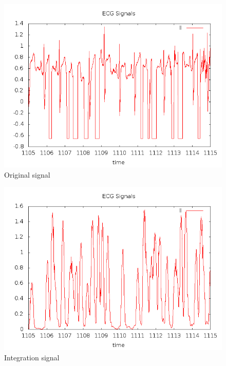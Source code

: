 \begin{figure}
        \centering
        \includegraphics[width=\textwidth]{ecg2_original.png}
        \caption{Original signal}
        \label{ecg2_original}
\end{figure}
\begin{figure}
        \centering
        \includegraphics[width=\textwidth]{ecg2_integration.png}
        \caption{Integration signal}
        \label{ecg2_integration}
\end{figure}
